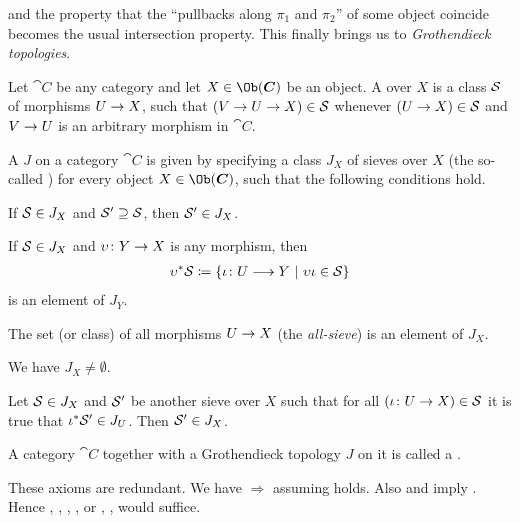\documentclass[a4paper,parskip=half,numbers=enddot, DIV=12]{scrreprt}
\begin{document}
and the property that the ``pullbacks along $\pi_1$ and $\pi_2$'' of some object coincide becomes the usual intersection property. This finally brings us to \emph{Grothendieck topologies}.
\begin{defi}
	Let $\cat C$ be any category and let $X\in\Ob(\cat C)$ be an object. A  over $X$ is a class $\mathcal{S}$ of morphisms $U\morphism X$, such that $(V\morphism U\morphism X)\in \Ss$ whenever $(U\morphism X)\in \Ss$ and $V\morphism U$ is an arbitrary morphism in $\cat C$.
\end{defi}
\begin{defi}
	A  $J$ on a category $\cat C$ is given by specifying a class $J_X$ of sieves over $X$ (the so-called ) for every object $X\in\Ob(\cat C)$, such that the following conditions hold.
	\begin{alphanumerate}
		\item If $\mathcal{S}\in J_X$ and $\mathcal{S}'\supseteq \mathcal{S}$, then $\mathcal{S}'\in J_X$.
		\item If $\mathcal{S}\in J_X$ and $\upsilon\colon Y\morphism X$ is any morphism, then
		\begin{align*}
			\upsilon^*\Ss\coloneqq\left\{\iota\colon U\morphism Y\st \upsilon\iota\in\Ss\right\}
		\end{align*}
		is an element of $ J_Y$.
		\item The set (or class) of all morphisms $U\morphism X$ (the \emph{all-sieve}) is an element of $ J_X$.
		\item[\itememph{c'}] We have $ J_X\neq\emptyset$.
		\item Let $\mathcal{S}\in J_X$ and $\mathcal{S}'$ be another sieve over $X$ such that for all $(\iota\colon U\morphism X)\in\Ss$ it is true that $\iota^*\mathcal{S}'\in J_U$. Then $\mathcal{S}'\in J_X$.
	\end{alphanumerate}
	A category $\cat C$ together with a Grothendieck topology $J$ on it is called a .
\end{defi}
\begin{rem}
	These axioms are redundant. We have  $\Rightarrow$  assuming  holds. Also  and  imply . Hence , , , , or , ,  would suffice.
\end{rem}
\end{document}

